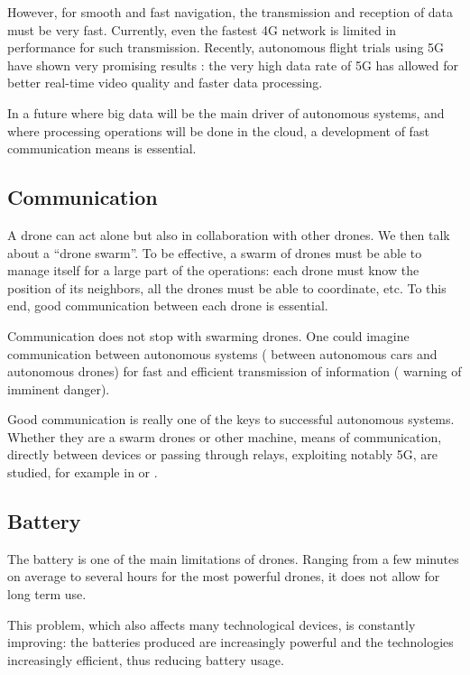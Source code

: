 However, for smooth and fast navigation, the transmission and reception of data must be very fast. Currently, even the fastest 4G network is limited in performance for such transmission. Recently, autonomous flight trials using 5G have shown very promising results \cite{percepto2021future}: the very high data rate of 5G has allowed for better real-time video quality and faster data processing.

In a future where big data will be the main driver of autonomous systems, and where processing operations will be done in the cloud, a development of fast communication means is essential.

\subsection{Communication}

A drone can act alone but also in collaboration with other drones. We then talk about a \enquote{drone swarm}. To be effective, a swarm of drones must be able to manage itself for a large part of the operations: each drone must know the position of its neighbors, all the drones must be able to coordinate, etc. To this end, good communication between each drone is essential.

Communication does not stop with swarming drones. One could imagine communication between autonomous systems (\eg{} between autonomous cars and autonomous drones) for fast and efficient transmission of information (\eg{} warning of imminent danger).

Good communication is really one of the keys to successful autonomous systems. Whether they are a swarm drones or other machine, means of communication, directly between devices or passing through relays, exploiting notably 5G, are studied, for example in \cite{campion2018uav} or \cite{zeng2017energy}.

\subsection{Battery}

The battery is one of the main limitations of drones. Ranging from a few minutes on average to several hours for the most powerful drones, it does not allow for long term use.

This problem, which also affects many technological devices, is constantly improving: the batteries produced are increasingly powerful and the technologies increasingly efficient, thus reducing battery usage.

